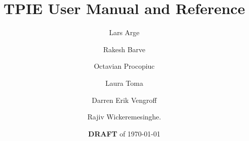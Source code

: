 

\setlength{\topmargin}{-.5in}   
\setlength{\oddsidemargin}{.1in} %
\setlength{\evensidemargin}{.1in} %
\setlength{\textwidth}{6.3in}
\setlength{\textheight}{9in}

\makeindex



\newcommand{\edition}{0.9.01a}
\newcommand{\version}{0.9.01a}
\newcommand{\gxxversion}{2.8.1}





\title{TPIE User Manual and Reference}
\author{Lars Arge \and Rakesh Barve \and Octavian Procopiuc \and Laura
Toma\and 
        Darren Erik Vengroff \and Rajiv Wickeremesinghe.}
\date{{\bf DRAFT} of \today}

\maketitle

